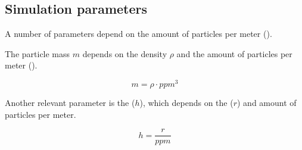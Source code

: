 \subsection{Simulation parameters}

A number of parameters depend on the amount of particles per meter
().

The particle mass $m$ depends on the density $\rho$ and the amount of particles
per meter ().

\[
m = \rho \cdot ppm^3
\]

Another relevant parameter is the  ($h$), which
depends on the  ($r$) and amount of particles per
meter.

\[
h = \frac{r}{ppm}
\]
